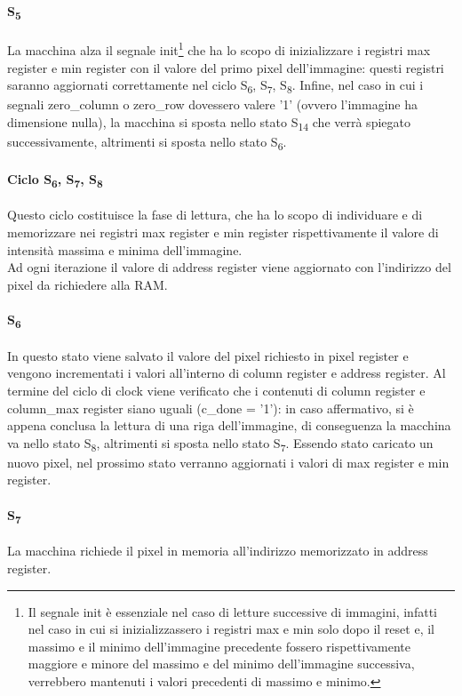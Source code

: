 \paragraph{S\textsubscript{5}}
La macchina alza il segnale init\footnote{Il segnale init è essenziale nel caso di letture successive di immagini, infatti nel caso in cui si inizializzassero i registri max e min solo dopo il reset e, il massimo e il minimo dell'immagine precedente fossero rispettivamente maggiore e minore del massimo e del minimo dell'immagine successiva, verrebbero mantenuti i valori precedenti di massimo e minimo.} che ha lo scopo di inizializzare i registri max register e min register con il valore del primo pixel dell'immagine: questi registri saranno aggiornati correttamente nel ciclo S\textsubscript{6}, S\textsubscript{7}, S\textsubscript{8}.
Infine, nel caso in cui i segnali zero\_column o zero\_row dovessero valere '1' (ovvero l'immagine ha dimensione nulla), la macchina si sposta nello stato S\textsubscript{14} che verrà spiegato successivamente, altrimenti si sposta nello stato S\textsubscript{6}.
\paragraph{Ciclo S\textsubscript{6}, S\textsubscript{7}, S\textsubscript{8}}
Questo ciclo costituisce la fase di lettura, che ha lo scopo di individuare e di memorizzare nei registri max register e min register rispettivamente il valore di intensità massima e minima dell'immagine.\\
Ad ogni iterazione il valore di address register viene aggiornato con l'indirizzo del pixel da richiedere alla RAM.
\paragraph{S\textsubscript{6}}
In questo stato viene salvato il valore del pixel richiesto in pixel register e vengono incrementati i valori all'interno di column register e address register. Al termine del ciclo di clock viene verificato che i contenuti di column register e column\_max register siano uguali (c\_done = '1'): in caso affermativo, si è appena conclusa la lettura di una riga dell'immagine, di conseguenza la macchina va nello stato S\textsubscript{8}, altrimenti si sposta nello stato S\textsubscript{7}.
Essendo stato caricato un nuovo pixel, nel prossimo stato verranno aggiornati i valori di max register e min register.
\paragraph{S\textsubscript{7}}
La macchina richiede il pixel in memoria all'indirizzo memorizzato in address register.
